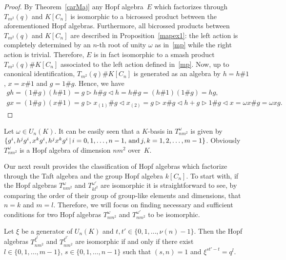 \begin{proof} By Theorem~\ref{carMaj} any Hopf algebra~$E$ which factorizes through $T_{m^{2}}(q)$ and $K[C_n]$ is isomorphic to a bicrossed product
between the aforementioned Hopf algebras. Furthermore, all bicrossed products between $T_{m^{2}}(q)$ and $K[C_n]$ are described in Proposition~\ref{mapex1}: the left action is completely determined by an $n$-th root of unity $\omega$ as in~\eqref{mp} while the right action is trivial. Therefore, $E$ is in fact isomorphic to a smash product $T_{m^{2}}(q) \# K[C_n]$ associated to the left action defined in~\eqref{mp}. Now, up to canonical identification, $T_{m^{2}}(q) \# K[C_n]$ is generated as an algebra by $h = h \# 1$, $x = x \# 1$ and $g = 1\# g$. Hence, we have
\begin{gather*}
gh = (1\# g) (h \# 1)= g \triangleright h \# g \triangleleft h = h \# g = (h \# 1)(1 \# g) = hg,\\
g x = (1 \# g) (x \# 1) = g \triangleright x_{(1)}
\# g \triangleleft x_{(2)} = g \triangleright x \# g \triangleleft h + g \triangleright 1 \# g \triangleleft x =\omega x \# g = \omega x g. \tag*{\qed}
\end{gather*}\renewcommand{\qed}{}
\end{proof}
\begin{Remark}Let $\omega \in U_{n}(K)$. It can be easily seen that a $K$-basis in $T_{nm^{2}}^ {\omega}$ is given by $\{ g^{i}, h^{j} g^{i},
 x^{k} g^{i}, h^{j} x^{k} g^{i} \,| \,i = 0, 1,\dots, n-1, \,{\rm and}\, j, k = 1, 2,\dots, m-1 \}$. Obviously $T_{nm^{2}}^ {\omega}$ is a Hopf algebra of dimension $nm^{2}$ over~$K$.
\end{Remark}

Our next result provides the classification of Hopf algebras which factorize through the Taft algebra and the group Hopf algebra $k[C_{n}]$. To start with, if the Hopf algebras $T_{nm^{2}}^{\omega}$ and $T_{kl^{2}}^ {\omega '}$ are isomorphic it is straightforward to see, by comparing the order of their group of group-like elements and dimensions, that $n=k$ and $m=l$. Therefore, we will focus on finding necessary and sufficient conditions for two Hopf algebras $T_{nm^{2}}^ {\omega}$ and $T_{nm^{2}}^ {\omega '}$ to be isomorphic.

\begin{Theorem}\label{izo} Let $\xi$ be a generator of $U_n (K)$ and $t, t' \in \{ 0, 1,\dots, \nu (n) -1 \}$. Then the Hopf algebras $T_{nm^{2}}^ {\xi^{t}}$ and $T_{nm^{2}}^ {\xi^{t'}}$ are isomorphic if and only if there exist $l \in \{ 0, 1,\dots, m-1 \}$, $s \in \{ 0, 1,\dots, n-1 \}$ such that $(s, n) = 1$ and $\xi^{st' - t} = q^{l}$.
\end{Theorem}

